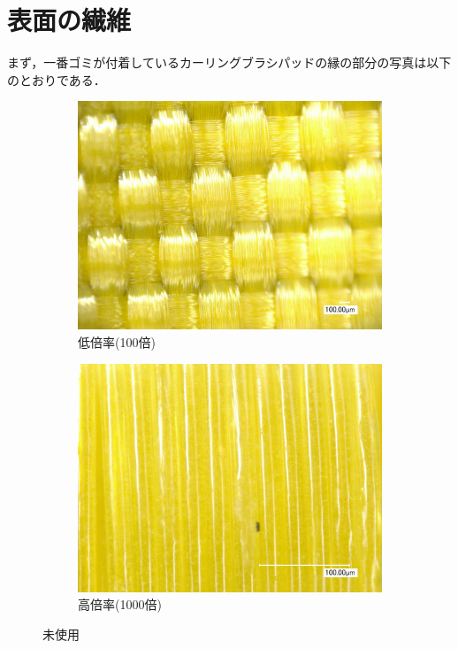 \documentclass[main]{subfiles}
\begin{document}
\section{表面の繊維}

まず，一番ゴミが付着しているカーリングブラシパッドの縁の部分の写真は以下のとおりである．


\begin{figure}[H]
    \centering
    \begin{subfigure}[htbp]{0.45\linewidth}
        \centering
        \includegraphics[keepaspectratio, width=0.8\linewidth]{figures/縁/カーリングパッド未使用低倍率.jpg}
        \caption{低倍率(100倍)}
        \label{fig:label}
    \end{subfigure}
    \begin{subfigure}[htbp]{0.45\linewidth}
        \centering
        \includegraphics[keepaspectratio, width=0.8\linewidth]{figures/縁/カーリングパッド未使用.jpg}
        \caption{高倍率(1000倍)}
        \label{fig:label}
    \end{subfigure}
    \caption{未使用}
    \label{fig:label}
\end{figure}
\end{document}

